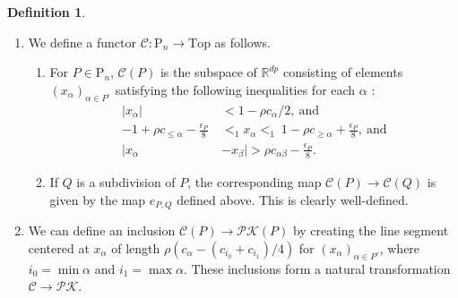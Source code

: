 \documentclass[reqno]{amsart}
\theoremstyle{definition}
\newtheorem{defi}{Definition}[section]
\theoremstyle{plain}
\newcommand{\eps}{\epsilon}
\newcommand{\PK}{\mathcal{PK}} %
\newcommand{\CG}{\mathrm{Top}}%
\newcommand{\RR}{\mathbb{R}}
\newcommand{\PP}{\mathrm{P}} %
\begin{document}
\begin{defi}
\begin{enumerate}
\item We define a functor $\mathcal{C}:\PP_n\to \CG$ as follows.
\begin{enumerate}
\item  For $P\in \PP_n$, $\mathcal{C}(P)$ is the subspace of $\RR^{dp}$ consisting of elements $(x_\alpha)_{\alpha\in P^\circ}$ satisfying the following inequalities for each $\alpha$ :
\[
\begin{split}
|x_\alpha|& < 1-\rho c_\alpha/2,\  \text{and} \\
-1+\rho c_{\leq \alpha}-\frac{\eps_P}{8}\  &<_1 x_\alpha  <_1\  1-\rho c_{\geq \alpha}+\frac{\eps_P}{8},\ \text{and} \\
|x_\alpha&-x_\beta|  > \rho c_{\alpha\beta}-\frac{\eps_P}{8}.
\end{split}
\]
\item If $Q$ is a subdivision of $P$,  the corresponding map $ \mathcal{C}(P)\to \mathcal{C}(Q)$ is given by the map $e_{P,Q}$ defined above. This is clearly well-defined.


\end{enumerate} 
\item We can define an inclusion $\mathcal{C}(P)\to \PK (P)$ by creating the line segment centered at $x_\alpha$ of length $\rho (c_{\alpha}-(c_{i_0}+c_{i_1})/4)$ for $(x_\alpha)_{\alpha\in P^\circ}$, where $i_0=\min \alpha$ and $i_1=\max\alpha$. These inclusions form a natural transformation $\mathcal{C}\to \PK$. 
\end{enumerate}

\end{defi}
\end{document}
